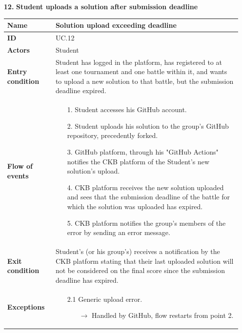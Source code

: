 \documentclass{article}
\begin{document}
{\begin{enumerate}
    \item[\textbf{12.}] \textbf{Student uploads a solution after submission deadline}
          \begin{xltabular}{\textwidth}
              {| >{\raggedright\arraybackslash}g | >{\raggedright\arraybackslash}X |}
              \hline
              \endfirsthead
              \hline
              \endhead
              \endfoot
              \hline
              \endlastfoot




              \textbf{Name} & Solution upload exceeding deadline\\
              \hline
              \textbf{ID} & UC.12\\
              \hline
              \textbf{Actors} & Student\\
              \hline
              \textbf{Entry condition} & Student has logged in the platform, has registered to at least one tournament
              and one battle within it, and wants to upload a new solution to that battle, but the submission deadline
              expired. \\
              \hline
              \textbf{Flow of events} &    \begin{enumerate}
                  \item[1.] Student accesses his GitHub account.
                  \item[2.] Student uploads his solution
                        to the group's GitHub repository, precedently forked.
                  \item[3.] GitHub platform, through his "GitHub Actions" notifies
                        the CKB platform of the Student's new solution's upload.
                  \item[4.] CKB platform receives the new solution uploaded and sees
                        that the submission deadline of the battle for which the solution
                        was uploaded has expired.
                  \item[5.] CKB platform notifies the group's members of the error by sending an error message.
              \end{enumerate} \\
              \hline
              \textbf{Exit condition} & Student's (or his group's) receives a notification by the CKB platform
              stating that their last uploaded solution will not be considered on the final score since the
              submission deadline has expired.\\
              \hline
              \textbf{Exceptions} &    \begin{itemize}
                  \item[2.1] Generic upload error.
                        \begin{itemize}
                            \item[$\rightarrow$] Handled by GitHub, flow restarts from point 2.
                        \end{itemize}
              \end{itemize}
          \end{xltabular}


\end{enumerate}}
\end{document}
